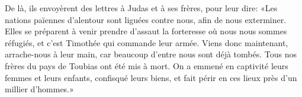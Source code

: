 De là, ils envoyèrent des lettres à Judas et à ses frères, pour leur dire:
	«Les nations païennes d’alentour sont liguées contre nous, afin de nous exterminer.
Elles se préparent à venir prendre d’assaut la forteresse où nous nous sommes réfugiés,
	et c’est Timothée qui commande leur armée.
Viens donc maintenant, arrache-nous à leur main,
	car beaucoup d’entre nous sont déjà tombés.
Tous nos frères du pays de Toubias ont été mis à mort.
	On a emmené en captivité leurs femmes et leurs enfants, confisqué leurs biens,
	et fait périr en ces lieux près d’un millier d’hommes.»
